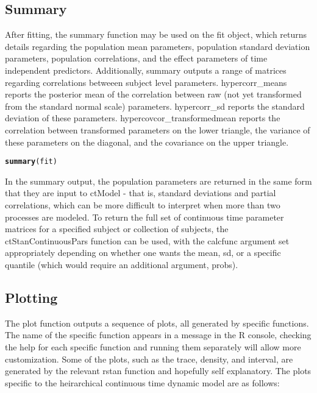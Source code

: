 \documentclass[nojss]{jss}\usepackage[]{graphicx}\usepackage[]{color}
\makeatletter
\newcommand{\hlstd}[1]{\textcolor[rgb]{0.345,0.345,0.345}{#1}}%
\newcommand{\hlkwd}[1]{\textcolor[rgb]{0.737,0.353,0.396}{\textbf{#1}}}%
\newenvironment{kframe}{%
 \def\at@end@of@kframe{}%
 \ifinner\ifhmode%
  \def\at@end@of@kframe{\end{minipage}}%
  \begin{minipage}{\columnwidth}%
 \fi\fi%
 \def\FrameCommand##1{\hskip\@totalleftmargin \hskip-\fboxsep
 \colorbox{shadecolor}{##1}\hskip-\fboxsep
     \hskip-\linewidth \hskip-\@totalleftmargin \hskip\columnwidth}%
 \MakeFramed {\advance\hsize-\width
   \@totalleftmargin\z@ \linewidth\hsize
   \@setminipage}}%
 {\par\unskip\endMakeFramed%
 \at@end@of@kframe}
\newenvironment{knitrout}{}{} %
\makeatother
\begin{document}
\subsection{Summary}
After fitting, the summary function may be used on the fit object, which returns details regarding the population mean parameters, population standard deviation parameters, population correlations, and the effect parameters of time independent predictors. 
Additionally, summary outputs a range of matrices regarding correlations betweeen subject level parameters. hypercorr\_means reports the posterior mean of the correlation between raw (not yet transformed from the standard normal scale) parameters. hypercorr\_sd reports the standard deviation of these parameters. hypercovcor\_transformedmean reports the correlation between transformed parameters on the lower triangle, the variance of these parameters on the diagonal, and the covariance on the upper triangle.

\begin{knitrout}\small
{}\color{fgcolor}\begin{kframe}
\begin{alltt}
\hlkwd{summary}\hlstd{(fit)}
\end{alltt}
\end{kframe}
\end{knitrout}

In the summary output, the population parameters are returned in the same form that they are input to ctModel - that is, standard deviations and partial correlations, which can be more difficult to interpret when more than two processes are modeled. To return the full set of continuous time parameter matrices for a specified subject or collection of subjects, the ctStanContinuousPars function can be used, with the calcfunc argument set appropriately depending on whether one wants the mean, sd, or a specific quantile (which would require an additional argument, probs).

\subsection{Plotting}
The plot function outputs a sequence of plots, all generated by specific functions. The name of the specific function appears in a message in the R console, checking the help for each specific function and running them separately will allow more customization. Some of the plots, such as the trace, density, and interval, are generated by the relevant rstan function and hopefully self explanatory. The plots specific to the heirarchical continuous time dynamic model are as follows:
\end{document}
